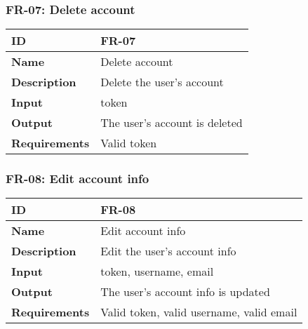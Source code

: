     \subsubsection{FR-07: Delete account}
    \begin{center}
        \begin{tabularx}{\textwidth}{|l|X|}
            \hline
            \textbf{ID} & FR-07 \\
            \hline
            \textbf{Name} & Delete account \\
            \hline
            \textbf{Description} & Delete the user's account \\
            \hline
            \textbf{Input} & token \\
            \hline
            \textbf{Output} & The user's account is deleted \\
            \hline
            \textbf{Requirements} & Valid token \\
            \hline
        \end{tabularx}
    \end{center}
    
    

    \subsubsection{FR-08: Edit account info}
    \begin{center}
        \begin{tabularx}{\textwidth}{|l|X|}
            \hline
            \textbf{ID} & FR-08 \\
            \hline
            \textbf{Name} & Edit account info \\
            \hline
            \textbf{Description} & Edit the user's account info \\
            \hline
            \textbf{Input} & token, username, email \\
            \hline
            \textbf{Output} & The user's account info is updated \\
            \hline
            \textbf{Requirements} & Valid token, valid username, valid email \\
            \hline
        \end{tabularx}
    \end{center}
    \newpage
    

